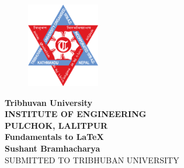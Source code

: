 \thispagestyle{empty}
% 
\begin{figure}
    \centering
    \includegraphics[width=1.25in]{tu.png}
\end{figure}
\begin{center}
    {\fontsize{14pt}{28}\selectfont%
    \textbf{Tribhuvan University\\
    INSTITUTE OF ENGINEERING\\
     PULCHOK, LALITPUR\\
    \vspace{0.5in}
    Fundamentals to \LaTeX\\
    \vspace{0.75in}
    Sushant Bramhacharya}\\
    \vspace{0.75in}
    SUBMITTED TO TRIBHUBAN UNIVERSITY\\
    
    }
\end{center}
% 

